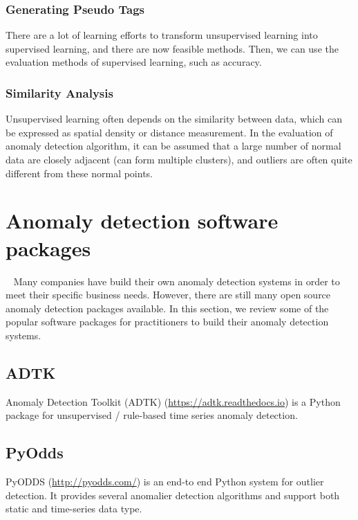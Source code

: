 \subsubsection{Generating Pseudo Tags}

There are a lot of learning efforts to transform
unsupervised learning into supervised learning,
and there are now feasible methods.
Then,
we can use the evaluation methods of supervised learning,
such as accuracy.

\subsubsection{Similarity Analysis}

Unsupervised learning often depends
on the similarity between data,
which can be expressed as spatial density
or distance measurement.
In the evaluation of anomaly detection algorithm,
it can be assumed that a large number of normal
data are closely adjacent (can form multiple clusters),
and outliers are often quite different from these normal points.

\section{Anomaly detection software packages}~\label{sec:tools}
Many companies have build 
their own anomaly detection systems in order to 
meet their specific business needs. 
However,
there are still many open source anomaly detection packages available. 
In this section, 
we review some of the popular software packages for 
practitioners to build their anomaly detection systems.

\subsection{ADTK}

Anomaly Detection Toolkit (ADTK) (\href{https://adtk.readthedocs.io}{https://adtk.readthedocs.io}) is a Python package for
unsupervised / rule-based time series anomaly detection.

\subsection{PyOdds}

PyODDS (\href{http://pyodds.com/}{http://pyodds.com/}) is an end-to end Python system for
outlier detection. 
It provides several anomalier detection algorithms and 
support both static and time-series data type.


